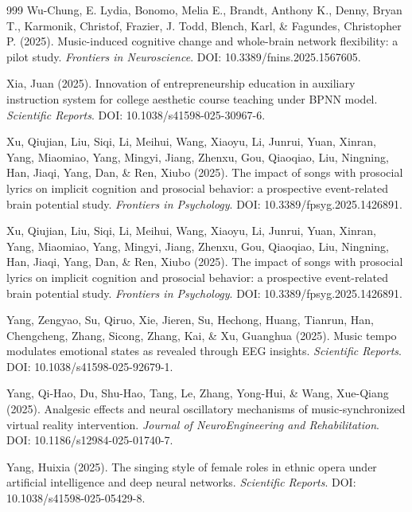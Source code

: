 \documentclass[9pt,onecolumn]{article}
\begin{document}
\begin{thebibliography}{999}
Wu-Chung, E. Lydia, Bonomo, Melia E., Brandt, Anthony K., Denny, Bryan T., Karmonik, Christof, Frazier, J. Todd, Blench, Karl, \& Fagundes, Christopher P. (2025). Music-induced cognitive change and whole-brain network flexibility: a pilot study. \textit{Frontiers in Neuroscience}. DOI: 10.3389/fnins.2025.1567605.

Xia, Juan (2025). Innovation of entrepreneurship education in auxiliary instruction system for college aesthetic course teaching under BPNN model. \textit{Scientific Reports}. DOI: 10.1038/s41598-025-30967-6.

Xu, Qiujian, Liu, Siqi, Li, Meihui, Wang, Xiaoyu, Li, Junrui, Yuan, Xinran, Yang, Miaomiao, Yang, Mingyi, Jiang, Zhenxu, Gou, Qiaoqiao, Liu, Ningning, Han, Jiaqi, Yang, Dan, \& Ren, Xiubo (2025). The impact of songs with prosocial lyrics on implicit cognition and prosocial behavior: a prospective event-related brain potential study. \textit{Frontiers in Psychology}. DOI: 10.3389/fpsyg.2025.1426891.

Xu, Qiujian, Liu, Siqi, Li, Meihui, Wang, Xiaoyu, Li, Junrui, Yuan, Xinran, Yang, Miaomiao, Yang, Mingyi, Jiang, Zhenxu, Gou, Qiaoqiao, Liu, Ningning, Han, Jiaqi, Yang, Dan, \& Ren, Xiubo (2025). The impact of songs with prosocial lyrics on implicit cognition and prosocial behavior: a prospective event-related brain potential study. \textit{Frontiers in Psychology}. DOI: 10.3389/fpsyg.2025.1426891.

Yang, Zengyao, Su, Qiruo, Xie, Jieren, Su, Hechong, Huang, Tianrun, Han, Chengcheng, Zhang, Sicong, Zhang, Kai, \& Xu, Guanghua (2025). Music tempo modulates emotional states as revealed through EEG insights. \textit{Scientific Reports}. DOI: 10.1038/s41598-025-92679-1.

Yang, Qi-Hao, Du, Shu-Hao, Tang, Le, Zhang, Yong-Hui, \& Wang, Xue-Qiang (2025). Analgesic effects and neural oscillatory mechanisms of music-synchronized virtual reality intervention. \textit{Journal of NeuroEngineering and Rehabilitation}. DOI: 10.1186/s12984-025-01740-7.

Yang, Huixia (2025). The singing style of female roles in ethnic opera under artificial intelligence and deep neural networks. \textit{Scientific Reports}. DOI: 10.1038/s41598-025-05429-8.


\end{thebibliography}
\end{document}
